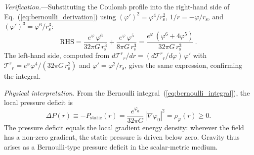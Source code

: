 \documentclass[aps,prd,onecolumn,superscriptaddress,nofootinbib,showpacs,12pt,notitlepage]{revtex4-2}
\newcommand{\rs}{r_{\mathrm{s}}}
\begin{document}
\textit{Verification.}---Substituting the Coulomb profile
into the right-hand side of
Eq.~(\ref{eq:bernoulli_derivation}) using
$(\varphi')^2 = \varphi^4/\rs^2$,
$1/r = -\varphi/\rs$, and
$(\varphi')^3 = \varphi^6/\rs^3$:
\begin{equation}
  \mathrm{RHS}
  = \frac{e^{\varphi}\,\varphi^6}{32\pi G\,\rs^3}
  + \frac{e^{\varphi}\,\varphi^5}{8\pi G\,\rs^3}
  = \frac{e^{\varphi}\,(\varphi^6 + 4\varphi^5)}{32\pi G\,\rs^3}\,.
\end{equation}
The left-hand side, computed from
$d\mathcal{T}^r{}_r/dr
= (d\mathcal{T}^r{}_r/d\varphi)\,\varphi'$
with
$\mathcal{T}^r{}_r = e^{\varphi}\varphi^4/(32\pi G\,\rs^2)$
and $\varphi' = \varphi^2/\rs$, gives the same expression,
confirming the integral.

\textit{Physical interpretation.}  From the Bernoulli
integral~(\ref{eq:bernoulli_integral}), the local pressure
deficit is
\begin{equation}\label{eq:pressure_deficit}
  \Delta P(r) \equiv -P_{\mathrm{static}}(r)
  = \frac{e^{\varphi_0}}{32\pi G}\,|\nabla\varphi_0|^{2}
  = \rho_\varphi(r) \geq 0.
\end{equation}
The pressure deficit equals the local gradient energy
density: wherever the field has a non-zero gradient,
the static pressure is driven below zero.
Gravity thus arises as a Bernoulli-type pressure
deficit in the scalar-metric medium.
\end{document}
